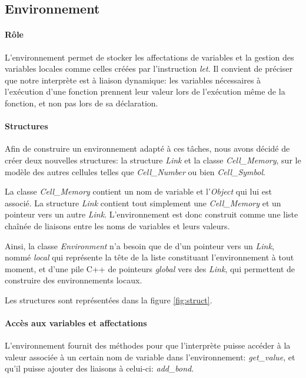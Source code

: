 \subsection{Environnement}

\paragraph{Rôle}
L'environnement permet de stocker les affectations de variables et la gestion
des variables locales comme celles créées par l'instruction \emph{let}. Il
convient de préciser que notre interprète est à liaison dynamique: les variables
nécessaires à l'exécution d'une fonction prennent leur valeur lors de l'exécution
même de la fonction, et non pas lors de sa déclaration.

\paragraph{Structures}
Afin de construire un environnement adapté à ces tâches, nous avons
décidé de créer deux nouvelles structures: la structure \emph{Link} et
la classe \emph{Cell\_Memory}, sur le modèle des autres cellules
telles que \emph{Cell\_Number} ou bien \emph{Cell\_Symbol}.

La classe \emph{Cell\_Memory} contient un nom de variable et
l'\emph{Object} qui lui est associé.  La structure \emph{Link}
contient tout simplement une \emph{Cell\_Memory} et un pointeur vers
un autre \emph{Link}.  L'environnement est donc construit comme une
liste chaînée de liaisons entre les noms de variables et leurs
valeurs.

Ainsi, la classe \emph{Environment} n'a besoin que de d'un pointeur
vers un \emph{Link}, nommé \emph{local} qui représente la tête de la
liste constituant l'environnement à tout moment, et d'une pile C++ de
pointeurs \emph{global} vers des \emph{Link}, qui permettent de
construire des environnements locaux.

Les structures sont représentées dans la figure \ref{fig:struct}.

\paragraph{Accès aux variables et affectations}
L'environnement fournit des méthodes pour que l'interprète puisse
accéder à la valeur associée à un certain nom de variable dans
l'environnement: \emph{get\_value}, et qu'il puisse ajouter des
liaisons à celui-ci: \emph{add\_bond}.

